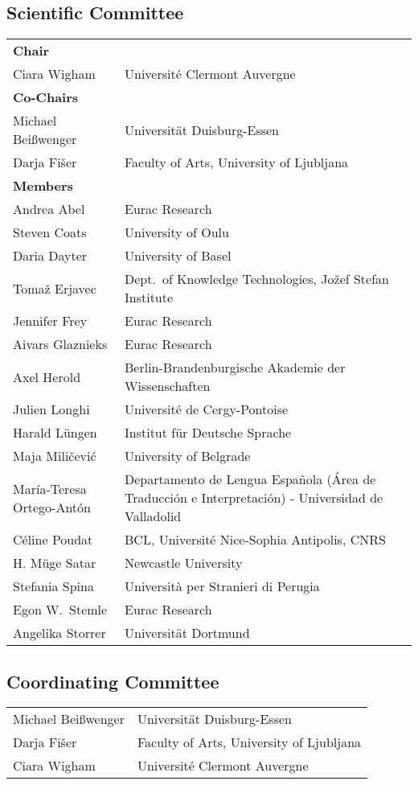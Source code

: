 \documentclass[a4paper, onesided]{easychair}
\begin{document}
\subsection*{Scientific Committee}
\begin{longtable}{p{}p{}} %
       \hline {\bf Chair} \medskip \\
    Ciara Wigham & Universit\'e Clermont Auvergne %
       \bigskip \\ \hline {\bf Co-Chairs} \medskip \\
    Michael Bei{\ss}wenger & Universit\"at Duisburg-Essen\\
    Darja Fi\v{s}er & Faculty of Arts, University of Ljubljana %
       \bigskip\\ \hline {\bf Members} \medskip \\ 
    Andrea Abel & Eurac Research\\
    Steven Coats & University of Oulu\\
    Daria Dayter & University of Basel\\
    Toma\v{z} Erjavec & Dept.~of Knowledge Technologies, Jo\v{z}ef Stefan Institute\\
    Jennifer Frey & Eurac Research\\
    Aivars Glaznieks & Eurac Research\\
    Axel Herold & Berlin-Brandenburgische Akademie der Wissenschaften\\
    Julien Longhi & Universit\'e de Cergy-Pontoise\\
    Harald L\"ungen & Institut f\"ur Deutsche Sprache\\
    Maja Mili\v{c}evi\'c & University of Belgrade\\
    Mar\'ia-Teresa Ortego-Ant\'on & Departamento de Lengua Espa\~{n}ola (\'Area de Traducci\'on e Interpretaci\'on) - Universidad de Valladolid\\
    C\'eline Poudat & BCL, Universit\'e Nice-Sophia Antipolis, CNRS\\
    H. M\"uge Satar & Newcastle University\\
    Stefania Spina & Universit\`a per Stranieri di Perugia\\
    Egon W.~Stemle & Eurac Research\\
    Angelika Storrer & Universit\"at Dortmund\\
\end{longtable}

\bigskip
\subsection*{Coordinating Committee}
\begin{longtable}{p{}p{}}
    Michael Bei{\ss}wenger & Universit\"at Duisburg-Essen\\
    Darja Fi\v{s}er & Faculty of Arts, University of Ljubljana\\
    Ciara Wigham & Universit\'e Clermont Auvergne\\
\end{longtable}
\end{document}
